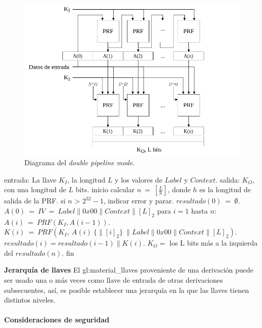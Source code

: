 \begin{figure}[H]
  \begin{center}
    \includegraphics[width=0.75\linewidth]{diagramas/dpipeline_mode}
    \caption{Diagrama del \textit{double pipeline mode}.}
    \label{diagrama_dpipeline_mode}
   \end{center}
\end{figure}

\begin{pseudocodigo}[caption={Funcionamiento del \textit{double pipeline mode}.}, 
label={mi:3}]
  entrada:   La llave $K_I$, la longitud $L$ y los valores de $Label$ y $Context$.
  salida:    $K_O$, con una longitud de $L$ bits.
  inicio
    calcular $n\: =\: [\frac{L}{h}]$, donde $h$ es la longitud de salida de la PRF.
    si $n$ > $2^{32}-1$, indicar error y parar.
    $resultado(0)\: =\: \emptyset$.
    $A(0)\: =\: IV\: =\: Label \parallel 0x00 \parallel Context \parallel {[L]}_2$
    para $i=1$ hasta $n$:
      $A(i)\: =\: PRF(K_I, A(i-1))$.
      $K(i)\: =\: PRF(K_I,\: A(i)\: \{\parallel {[i]}_2\}\: \parallel Label \parallel 0x00 \parallel Context \parallel {[L]}_2)$.
      $resultado(i) = resultado(i-1) \parallel K(i)$.
    $K_O =$ los L bits más a la izquierda del $resultado(n)$. 
  fin
\end{pseudocodigo}

\textbf{Jerarquía de llaves}
El \gls{gl:material_llaves} proveniente de una derivación puede ser usado una 
o más veces como llave de entrada de otras derivaciones subsecuentes, así, es 
posible establecer una jerarquía en la que las llaves tienen distintos niveles.

\paragraph{Consideraciones de seguridad\newline}

